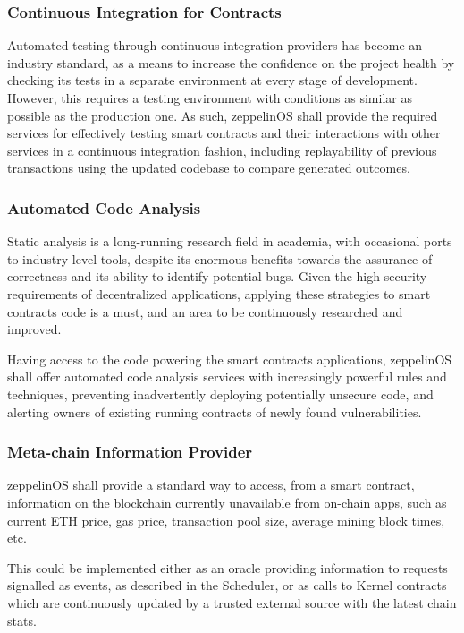 \documentclass[]{article}
\makeatletter
\DeclareRobustCommand{\_}{%
  \leavevmode\vbox{%
    \hrule\@width.5em
          \@height-.26ex
          \@depth\dimexpr.26ex+.28pt\relax}}
\makeatother
\begin{document}
\subsubsection{Continuous Integration for Contracts}

Automated testing through continuous integration providers has become an
industry standard, as a means to increase the confidence on the project health
by checking its tests in a separate environment at every stage of development.
However, this requires a testing environment with conditions as similar as
possible as the production one. As such, zeppelinOS shall provide the required
services for effectively testing smart contracts and their interactions with
other services in a continuous integration fashion, including replayability of
previous transactions using the updated codebase to compare generated outcomes.

\subsubsection{Automated Code Analysis}

Static analysis is a long-running research field in academia, with
occasional ports to industry-level tools, despite its enormous benefits
towards the assurance of correctness and its ability to identify
potential bugs. Given the high security requirements of decentralized
applications, applying these strategies to smart contracts code is a
must, and an area to be continuously researched and improved.

Having access to the code powering the smart contracts applications,
zeppelinOS shall offer automated code analysis services with
increasingly powerful rules and techniques, preventing inadvertently
deploying potentially unsecure code, and alerting owners of existing
running contracts of newly found vulnerabilities.

\subsubsection{Meta-chain Information Provider}

zeppelinOS shall provide a standard way to access, from a smart
contract, information on the blockchain currently unavailable from
on-chain apps, such as current ETH price, gas price, transaction pool
size, average mining block times, etc.

This could be implemented either as an oracle providing information to
requests signalled as events, as described in the Scheduler, or as calls
to Kernel contracts which are continuously updated by a trusted external
source with the latest chain stats.
\end{document}
